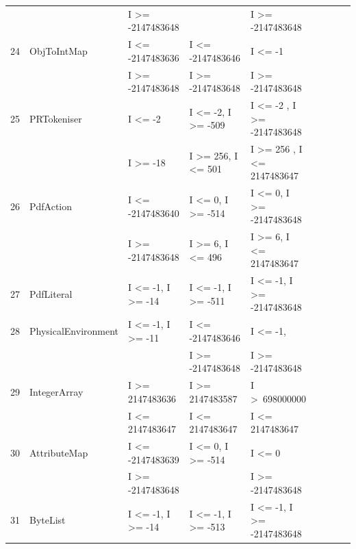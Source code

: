 \documentclass[runningheads,a4paper]{llncs}
\begin{document}
\begin{table}[h]
{{\begin{tabular}{|l|l|l|l|l|l|l|l|l|}
	&                                             & I \textgreater= -2147483648				& 										& I \textgreater= -2147483648				\\	
24	& ObjToIntMap				& I \textless= -2147483636					& I \textless= -2147483646				& I \textless= -1								\\ 
	&                                             & I \textgreater= -2147483648				& I \textgreater= -2147483648			& I \textgreater= -2147483648			   	\\	
25	& PRTokeniser				& I \textless= -2								& I \textless= -2, I \textgreater= -509		& I \textless= -2 , I \textgreater= -2147483648\\ 
	&                                             & I \textgreater= -18							& I \textgreater= 256, I \textless= 501		& I \textgreater= 256	, I \textless= 2147483647\\
26	& PdfAction					& I \textless= -2147483640 					& I \textless= 0, I \textgreater= -514		& I \textless= 0, I \textgreater= -2147483648 	\\ 
	&                                             & I \textgreater= -2147483648				& I \textgreater= 6, I \textless= 496		& I \textgreater= 6,  I \textless= 2147483647	\\	
27	& PdfLiteral					& I \textless= -1, I \textgreater= -14			& I \textless= -1, I \textgreater= -511		& I \textless= -1, I \textgreater= -2147483648	\\ 
28	& PhysicalEnvironment		& I \textless= -1, I \textgreater= -11			& I \textless= -2147483646				& I \textless= -1, 							\\ 
	& 							& 											& I \textgreater= -2147483648 			& I \textgreater= -2147483648				\\ 
29	& IntegerArray				& I \textgreater= 2147483636				& I \textgreater= 2147483587			& I \textgreater~698000000					\\ 
	&                                             & I \textless= 2147483647					& I \textless= 2147483647				&  I \textless= 2147483647					\\	
30	& AttributeMap				& I \textless= -2147483639					& I \textless= 0, I \textgreater= -514		& I \textless= 0								\\ 
	&                                             & I \textgreater= -2147483648				& 										& I \textgreater= -2147483648 			   	\\	
31	& ByteList					& I \textless= -1, I \textgreater= -14			& I \textless= -1, I \textgreater= -513		& I \textless= -1, I \textgreater= -2147483648	\\ 

\end{tabular}}}
\end{table}
\end{document}
